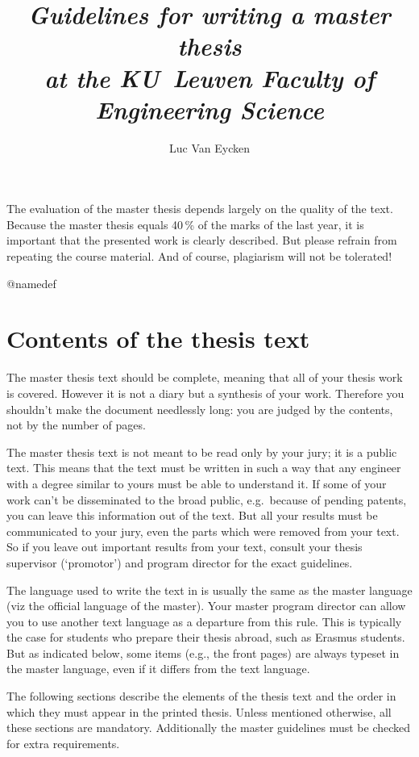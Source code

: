 \documentclass[11pt,article,oneside,a4paper]{memoir}
\newcommand\Dutch[1]{`\foreignlanguage{dutch}{#1}'}
\begin{document}
\title{\itshape Guidelines for writing a master thesis \\
  at the KU~Leuven Faculty of Engineering Science}
\author{Luc Van Eycken}
\maketitle
\bigskip

\noindent The evaluation of the master thesis depends largely on the
quality of the text. Because the master thesis equals 40\,\% of the marks
of the last year, it is important that the presented work is clearly
described. But please refrain from repeating the course material. And of
course, plagiarism will not be tolerated!

\medskip
\csname @namedef
\tableofcontents*
\medskip

\chapter{Contents of the thesis text}
The master thesis text should be complete, meaning that all of your thesis
work is covered. However it is not a diary but a synthesis of your work.
Therefore you shouldn't make the document needlessly long: you are judged
by the contents, not by the number of pages.

The master thesis text is not meant to be read only by your jury; it is a
public text. This means that the text must be written in such a way that
any engineer with a degree similar to yours must be able to understand it.
If some of your work can't be disseminated to the broad public, e.g.\
because of pending patents, you can leave this information out of the text.
But all your results must be communicated to your jury, even the parts
which were removed from your text. So if you leave out important results
from your text, consult your thesis supervisor (\Dutch{promotor}) and
program director for the exact guidelines.

The language used to write the text in is usually the same as the master
language (viz the official language of the master). Your master program
director can allow you to use another text language as a departure from
this rule. This is typically the case for students who prepare their thesis
abroad, such as Erasmus students. But as indicated below, some items (e.g.,
the front pages) are always typeset in the master language, even if it
differs from the text language.

The following sections describe the elements of the thesis text and the
order in which they must appear in the printed thesis. Unless mentioned
otherwise, all these sections are mandatory. Additionally the master
guidelines must be checked for extra requirements.
\end{document}
